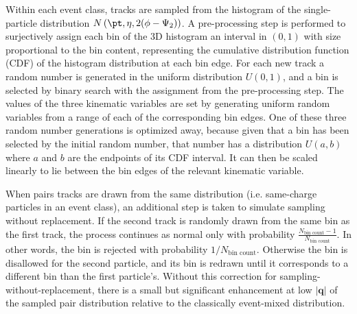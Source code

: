 Within each event class, tracks are sampled from the histogram of the single-particle distribution $N \left( \pt, \eta, 2(\phi-\psit) \right) $.
A pre-processing step is performed to surjectively assign each bin of the 3D histogram an interval in $(0,1)$ with size proportional to the bin content, representing the cumulative distribution function (CDF) of the histogram distribution at each bin edge.
For each new track a random number is generated in the uniform distribution $U(0,1)$, and a bin is selected by binary search with the assignment from the pre-processing step.
The values of the three kinematic variables are set by generating uniform random variables from a range of each of the corresponding bin edges.
One of these three random number generations is optimized away, because given that a bin has been selected by the initial random number, that number has a distribution $U(a, b)$ where $a$ and $b$ are the endpoints of its CDF interval.
It can then be scaled linearly to lie between the bin edges of the relevant kinematic variable.

When pairs tracks are drawn from the same distribution (i.e. same-charge particles in an event class), an additional step is taken to simulate sampling without replacement.
If the second track is randomly drawn from the same bin as the first track, the process continues as normal only with probability $\frac{N_\textrm{bin count} - 1}{N_\textrm{bin count}}$.
In other words, the bin is rejected with probability $1/N_\textrm{bin count}$.
Otherwise the bin is disallowed for the second particle, and its bin is redrawn until it corresponds to a different bin than the first particle's.
Without this correction for sampling-without-replacement, there is a small but significant enhancement at low $|\mathbf{q}|$ of the sampled pair distribution relative to the classically event-mixed distribution.

